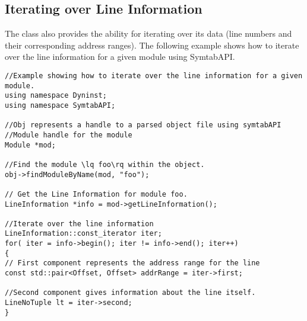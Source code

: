 \subsection{Iterating over Line Information}\label{LineNoIterating}
The  class also provides the ability for iterating over its data (line numbers and their corresponding address ranges). The following example shows how to iterate over the line information for a given module using SymtabAPI.

\begin{lstlisting}
//Example showing how to iterate over the line information for a given module.
using namespace Dyninst;
using namespace SymtabAPI;

//Obj represents a handle to a parsed object file using symtabAPI
//Module handle for the module
Module *mod;

//Find the module \lq foo\rq within the object.
obj->findModuleByName(mod, "foo");

// Get the Line Information for module foo.
LineInformation *info = mod->getLineInformation();

//Iterate over the line information
LineInformation::const_iterator iter;
for( iter = info->begin(); iter != info->end(); iter++)
{
// First component represents the address range for the line
const std::pair<Offset, Offset> addrRange = iter->first;

//Second component gives information about the line itself.
LineNoTuple lt = iter->second;
}
\end{lstlisting}
